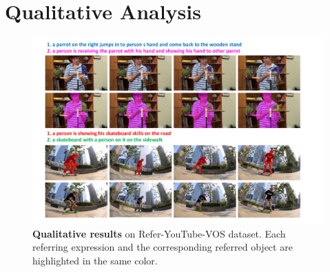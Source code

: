 

\section{Qualitative Analysis}
\label{sec:rvos_qualitative_analysis}

\begin{figure}[ht]
    \centering
    \includegraphics[width=\textwidth]{content/resources/images/referring_segmentation/QualitativeResults.pdf}
    \caption{\textbf{Qualitative results} on Refer-YouTube-VOS dataset. Each referring expression and the corresponding referred object are highlighted in the same color.}
    \label{fig:refyoutube_qualitative}
\end{figure}

